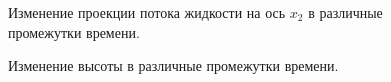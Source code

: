 \documentclass[14pt]{extreport}
\begin{document}
\begin{figure}[H]
  \centering
  \hfill
  \caption{Изменение проекции потока жидкости на ось $x_2$ в различные промежутки времени.}
  \label{img:ex3:q2:all}
\end{figure}

\begin{figure}[H]
  \centering
  \hfill
  \caption{Изменение высоты в различные промежутки времени.}
  \label{img:ex3:H:all}
\end{figure}
\end{document}
